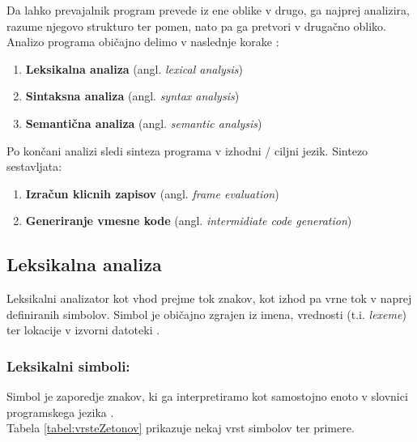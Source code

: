 \documentclass[a4paper, 12p]{book}
\begin{document}
Da lahko prevajalnik program prevede iz ene oblike v drugo, ga najprej analizira, razume njegovo strukturo ter pomen, nato pa ga pretvori v drugačno obliko.  \\
Analizo programa običajno delimo v naslednje korake \cite{modernCompiler}:
\begin{enumerate}
	\item \textbf{Leksikalna analiza} (angl. \textit{lexical analysis})
	\item \textbf{Sintaksna analiza} (angl. \textit{syntax analysis})
	\item \textbf{Semantična analiza} (angl. \textit{semantic analysis})
\end{enumerate}

Po končani analizi sledi sinteza programa v izhodni / ciljni jezik. Sintezo sestavljata:
\begin{enumerate}
	\item \textbf{Izračun klicnih zapisov} (angl. \textit{frame evaluation})
	\item \textbf{Generiranje vmesne kode} (angl. \textit{intermidiate code generation})
\end{enumerate}

\subsection{Leksikalna analiza}

Leksikalni analizator kot vhod prejme tok znakov, kot izhod pa vrne tok v naprej definiranih simbolov. Simbol je običajno zgrajen iz imena, vrednosti (t.i. \textit{lexeme}) ter lokacije v izvorni datoteki \cite{modernCompiler}.

\subsubsection{Leksikalni simboli:}

Simbol je zaporedje znakov, ki ga interpretiramo kot samostojno enoto v slovnici programskega jezika \cite{modernCompiler}. \\ 
Tabela \ref{tabel:vrsteZetonov} prikazuje nekaj vrst simbolov ter primere. \\
\end{document}
